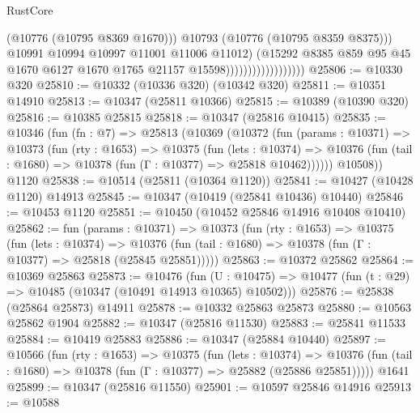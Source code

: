\begin{lexlean}{RustCore}
\begin{coremodule}
                                            (@10776 (@10795 @8369 @1670)))
                                          @10793
                                          (@10776 (@10795 @8359 @8375)))
                                        @10991
                                        @10994
                                        @10997
                                        @11001
                                        @11006
                                        @11012)
                                      (@15292
                                        @8385
                                        @859
                                        @95
                                        @45
                                        @1670
                                        @6127
                                        @1670
                                        @1765
                                        @21157
                                        @15598))))))))))))))))))
@25806 := @10330 @320
@25810 := @10332 (@10336 @320) (@10342 @320)
@25811 := @10351 @14910
@25813 := @10347 (@25811 @10366)
@25815 := @10389 (@10390 @320)
@25816 := @10385 @25815
@25818 := @10347 (@25816 @10415)
@25835 := @10346
    (fun (fn : @7) =>
    @25813
      (@10369
        (@10372
          (fun (params : @10371) =>
          @10373
            (fun (rty : @1653) =>
            @10375
              (fun (lets : @10374) =>
              @10376 (fun (tail : @1680) => @10378 (fun (Γ : @10377) => @25818 @10462))))))
        @10508))
    @1120
@25838 := @10514 (@25811 (@10364 @1120))
@25841 := @10427 (@10428 @1120) @14913
@25845 := @10347 (@10419 (@25841 @10436) @10440)
@25846 := @10453 @1120
@25851 := @10450 (@10452 @25846 @14916 @10408 @10410)
@25862 := fun (params : @10371) =>
  @10373
    (fun (rty : @1653) =>
    @10375
      (fun (lets : @10374) =>
      @10376 (fun (tail : @1680) => @10378 (fun (Γ : @10377) => @25818 (@25845 @25851)))))
@25863 := @10372 @25862
@25864 := @10369 @25863
@25873 := @10476
    (fun (U : @10475) => @10477 (fun (t : @29) => @10485 (@10347 (@10491 @14913 @10365) @10502)))
@25876 := @25838 (@25864 @25873) @14911
@25878 := @10332 @25863 @25873
@25880 := @10563 @25862 @1904
@25882 := @10347 (@25816 @11530)
@25883 := @25841 @11533
@25884 := @10419 @25883
@25886 := @10347 (@25884 @10440)
@25897 := @10566
    (fun (rty : @1653) =>
    @10375
      (fun (lets : @10374) =>
      @10376 (fun (tail : @1680) => @10378 (fun (Γ : @10377) => @25882 (@25886 @25851)))))
    @1641
@25899 := @10347 (@25816 @11550)
@25901 := @10597 @25846 @14916
@25913 := @10588

\end{coremodule}
\end{lexlean}
